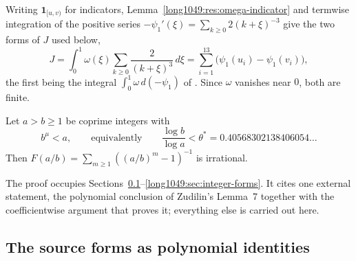 \documentclass[11pt]{article}
\begin{document}
\noindent Writing $\mathbf 1_{[u,v)}$ for indicators, Lemma~\ref{long1049:res:omega-indicator}
and termwise integration of the positive series
$-\psi_1'(\xi)=\sum_{k\ge0}2(k+\xi)^{-3}$ give the two forms of $J$ used below,
\[
 J=\int_0^1\omega(\xi)\sum_{k\ge0}\frac{2}{(k+\xi)^{3}}\,d\xi
  =\sum_{i=1}^{13}\bigl(\psi_1(u_i)-\psi_1(v_i)\bigr),
\]
the first being the integral $\int_0^1\omega\,d(-\psi_1)$ of
\cite[Lemma~2]{zudilin2004}.  Since $\omega$ vanishes near $0$, both are finite.

\begin{theorem}\label{long1049:res:region}
Let $a>b\ge1$ be coprime integers with
\[
 b^{\mu}<a,
 \qquad\text{equivalently}\qquad
 \frac{\log b}{\log a}<\theta^{*}=0.40568302138406054\ldots
\]
Then $F(a/b)=\sum_{m\ge1}(( a/b)^{m}-1)^{-1}$ is irrational.
\end{theorem}

The proof occupies Sections~\ref{long1049:sec:source-forms}--\ref{long1049:sec:integer-forms}.  It
cites one external statement, the polynomial conclusion of Zudilin's Lemma~7
together with the coefficientwise argument that proves it; everything else is
carried out here.

\subsection{The source forms as polynomial
identities}\label{long1049:sec:source-forms}
\end{document}
